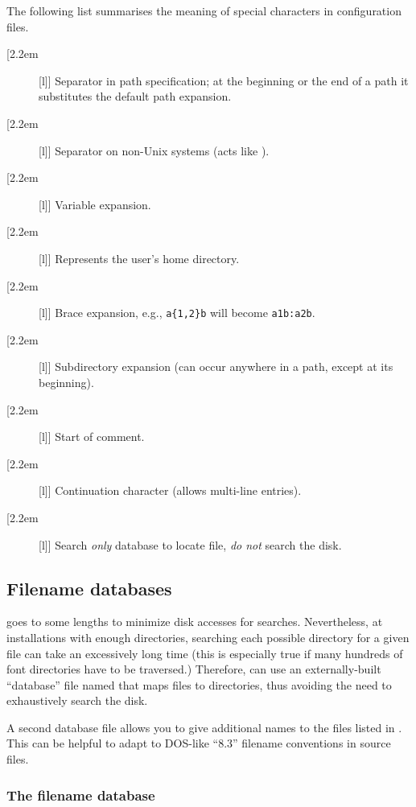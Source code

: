 \documentclass{article}
\def\bs{{\protect\normalfont\ttfamily\char'134}}
\begin{document}
The following list summarises the meaning of special characters
in \KPS{} configuration files.

\newcommand{\CODE}[1]{\makebox[2.2em][l]{\code{#1}}}
\begin{description}
\item[\CODE{:}] Separator in path specification; at the beginning or
  the end of a path it substitutes the default path expansion.
\item[\CODE{;}] Separator on non-Unix systems (acts like \code{:}).
\item[\CODE{\$}] Variable expansion.
\item[\CODE{\string~}] Represents the user's home directory. 
\item[\CODE{\char`\{\dots\char`\}}] Brace expansion, e.g.,
    \verb+a{1,2}b+ will become \verb+a1b:a2b+.
\item[\CODE{//}] Subdirectory expansion (can occur anywhere in
    a path, except at its beginning).
\item[\CODE{\%}] Start of comment.
\item[\CODE{\bs}] Continuation character (allows multi-line entries).
\item[\CODE{!!}] Search \emph{only} database to locate file, \emph{do
    not} search the disk.
\end{description}


\subsection{Filename databases}
\label{Filename-database}


\KPS{} goes to some lengths to minimize disk accesses for searches.
Nevertheless, at installations with enough directories, searching each
possible directory for a given file can take an excessively long time
(this is especially true if many hundreds of font directories have to
be traversed.)  Therefore, \KPS{} can use an externally-built
``database'' file named  that maps files to directories,
thus avoiding the need to exhaustively search the disk.

A second database file  allows you to give additional
names to the files listed in .  This can be helpful to
adapt to DOS-like ``8.3'' filename conventions in source files.

\subsubsection{The filename database}
\label{ls-R}
\end{document}
